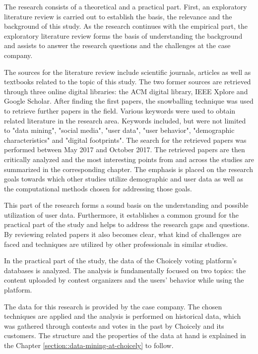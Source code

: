 The research consists of a theoretical and a practical part. First, an exploratory literature review is carried out to establish the basis, the relevance and the background of this study. As the research continues with the empirical part, the exploratory literature review forms the basis of understanding the background and assists to answer the research questions and the challenges at the case company. 

The sources for the literature review include scientific journals, articles as well as textbooks related to the topic of this study. The two former sources are retrieved through three online digital libraries: the ACM digital library, IEEE Xplore and Google Scholar. After finding the first papers, the snowballing technique was used to retrieve further papers in the field. Various keywords were used to obtain related literature in the research area. Keywords included, but were not limited to "data mining", "social media", "user data", "user behavior", "demographic characteristics" and "digital footprints". The search for the retrieved papers was performed between May 2017 and October 2017. The retrieved papers are then critically analyzed and the most interesting points from and across the studies are summarized in the corresponding chapter. The emphasis is placed on the research goals towards which other studies utilize demographic and user data as well as the computational methods chosen for addressing those goals. 

This part of the research forms a sound basis on the understanding and possible utilization of user data. Furthermore, it establishes a common ground for the practical part of the study and helps to address the research gaps and questions. By reviewing related papers it also becomes clear, what kind of challenges are faced and techniques are utilized by other professionals in similar studies.

In the practical part of the study, the data of the Choicely voting platform's databases is analyzed. The analysis is fundamentally focused on two topics: the content uploaded by contest organizers and the users' behavior while using the platform. 

The data for this research is provided by the case company. The chosen techniques are applied and the analysis is performed on historical data, which was gathered through contests and votes in the past by Choicely and its customers. The structure and the properties of the data at hand is explained in the Chapter \ref{section::data-mining-at-choicely} to follow. 

